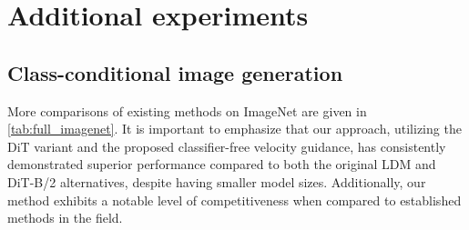 \documentclass{article}
\theoremstyle{plain}
\theoremstyle{definition}
\theoremstyle{remark}
\begin{document}
\section{Additional experiments}






\subsection{Class-conditional image generation}
More comparisons of existing methods on ImageNet  are given in \cref{tab:full_imagenet}. It is important to emphasize that our approach, utilizing the DiT variant and the proposed classifier-free velocity guidance, has consistently demonstrated superior performance compared to both the original LDM and DiT-B/2 alternatives, despite having smaller model sizes. Additionally, our method exhibits a notable level of competitiveness when compared to established methods in the field.
\end{document}
